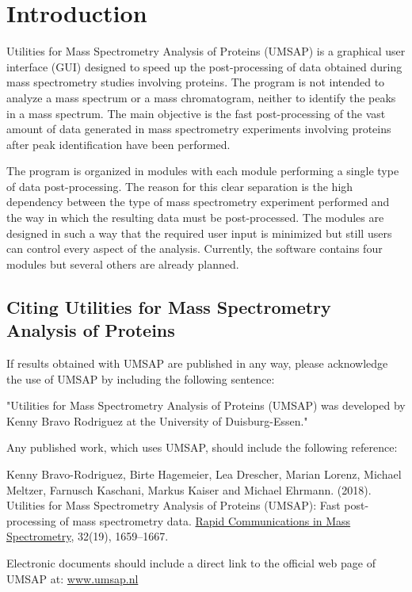 \chapter{Introduction}

Utilities for Mass Spectrometry Analysis of Proteins (UMSAP) is a graphical user interface (GUI) designed to speed up the post-processing of data obtained during mass spectrometry studies involving proteins. The program is not intended to analyze a mass spectrum or a mass chromatogram, neither to identify the peaks in a mass spectrum. The main objective is the fast post-processing of the vast amount of data generated in mass spectrometry experiments involving proteins after peak identification have been performed.

The program is organized in modules with each module performing a single type of data post-processing. The reason for this clear separation is the high dependency between the type of mass spectrometry experiment performed and the way in which the resulting data must be post-processed. The modules are designed in such a way that the required user input is minimized but still users can control every aspect of the analysis. Currently, the software contains four modules but several others are already planned. 

\section{Citing Utilities for Mass Spectrometry Analysis of Proteins}

If results obtained with UMSAP are published in any way, please acknowledge the use of UMSAP by including the following sentence:

"Utilities for Mass Spectrometry Analysis of Proteins (UMSAP) was developed by Kenny Bravo Rodriguez at the University of Duisburg-Essen."

Any published work, which uses UMSAP, should include the following reference:

Kenny Bravo-Rodriguez, Birte Hagemeier, Lea Drescher, Marian Lorenz, Michael Meltzer, Farnusch Kaschani, Markus Kaiser and Michael Ehrmann. (\num{2018}). Utilities for Mass Spectrometry Analysis of Proteins (UMSAP): Fast post-processing of mass spectrometry data. \href{https://onlinelibrary.wiley.com/doi/10.1002/rcm.8243}{Rapid Communications in Mass Spectrometry}, \num{32}(\num{19}), \numrange[range-phrase = --]{1659}{1667}.

Electronic documents should include a direct link to the official web page of UMSAP at:\newline
\href{https://www.umsap.nl}{www.umsap.nl}

